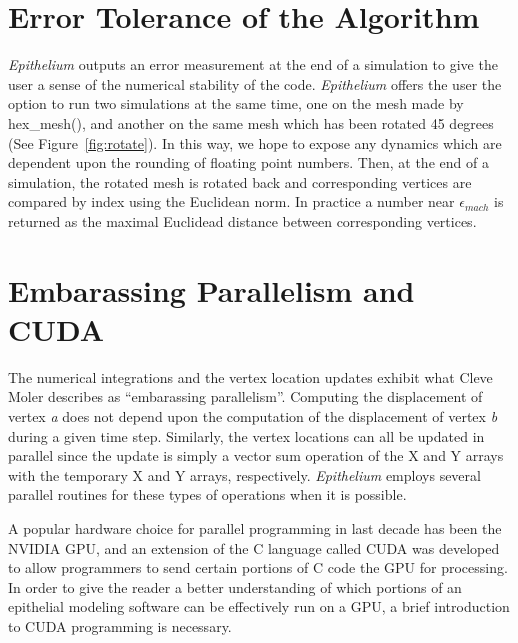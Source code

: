 \section{Error Tolerance of the Algorithm}
\emph{Epithelium} outputs an error measurement at the end of a simulation to give the user a sense of the numerical stability of the code. \emph{Epithelium} offers the user the option to run two simulations at the same time, one on the mesh made by hex\_mesh(), and another on the same mesh which has been rotated 45 degrees (See Figure~\ref{fig:rotate}). In this way, we hope to expose any dynamics which are dependent upon the rounding of floating point numbers. Then, at the end of a simulation, the rotated mesh is rotated back and corresponding vertices are compared by index using the Euclidean norm. In practice a number near $\epsilon_{mach}$ is returned as the maximal Euclidead distance between corresponding vertices.

\section{Embarassing Parallelism and CUDA}
The numerical integrations and the vertex location updates exhibit what Cleve Moler describes as ``embarassing parallelism''. Computing the displacement of vertex \emph{a} does not depend upon the computation of the displacement of vertex \emph{b} during a given time step. Similarly, the vertex locations can all be updated in parallel since the update is simply a vector sum operation of the X and Y arrays with the temporary X and Y arrays, respectively. \emph{Epithelium} employs several parallel routines for these types of operations when it is possible. 

A popular hardware choice for parallel programming in last decade has been the NVIDIA GPU, and an extension of the C language called CUDA was developed to allow programmers to send certain portions of C code the GPU for processing. In order to give the reader a better understanding of which portions of an epithelial modeling software can be effectively run on a GPU, a brief introduction to CUDA programming is necessary.

